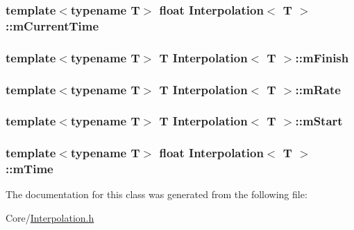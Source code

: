 \subsubsection[{\texorpdfstring{m\+Current\+Time}{mCurrentTime}}]{\setlength{\rightskip}{0pt plus 5cm}template$<$typename T$>$ float {\bf Interpolation}$<$ T $>$\+::m\+Current\+Time\hspace{0.3cm}{\ttfamily [protected]}}\hypertarget{classInterpolation_add1dd727ba837d544442bfd7b240bd3b}{}\label{classInterpolation_add1dd727ba837d544442bfd7b240bd3b}
\subsubsection[{\texorpdfstring{m\+Finish}{mFinish}}]{\setlength{\rightskip}{0pt plus 5cm}template$<$typename T$>$ T {\bf Interpolation}$<$ T $>$\+::m\+Finish\hspace{0.3cm}{\ttfamily [protected]}}\hypertarget{classInterpolation_a96f311853963b74a2337287590ceb909}{}\label{classInterpolation_a96f311853963b74a2337287590ceb909}
\subsubsection[{\texorpdfstring{m\+Rate}{mRate}}]{\setlength{\rightskip}{0pt plus 5cm}template$<$typename T$>$ T {\bf Interpolation}$<$ T $>$\+::m\+Rate\hspace{0.3cm}{\ttfamily [protected]}}\hypertarget{classInterpolation_a24a6681cfb8052d9c4db1c75b3849918}{}\label{classInterpolation_a24a6681cfb8052d9c4db1c75b3849918}
\subsubsection[{\texorpdfstring{m\+Start}{mStart}}]{\setlength{\rightskip}{0pt plus 5cm}template$<$typename T$>$ T {\bf Interpolation}$<$ T $>$\+::m\+Start\hspace{0.3cm}{\ttfamily [protected]}}\hypertarget{classInterpolation_a9bba635b064dd3e0611b0facc4a01170}{}\label{classInterpolation_a9bba635b064dd3e0611b0facc4a01170}
\subsubsection[{\texorpdfstring{m\+Time}{mTime}}]{\setlength{\rightskip}{0pt plus 5cm}template$<$typename T$>$ float {\bf Interpolation}$<$ T $>$\+::m\+Time\hspace{0.3cm}{\ttfamily [protected]}}\hypertarget{classInterpolation_a3ea4f26ef55bebf383e816fe60b5e967}{}\label{classInterpolation_a3ea4f26ef55bebf383e816fe60b5e967}


The documentation for this class was generated from the following file\+:\begin{DoxyCompactItemize}
\item 
Core/\hyperlink{Interpolation_8h}{Interpolation.\+h}\end{DoxyCompactItemize}
